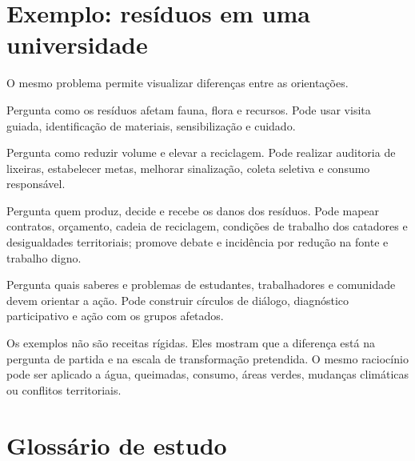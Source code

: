 \documentclass[12pt,a4paper]{article}
\begin{document}
\section{Exemplo: resíduos em uma universidade}

O mesmo problema permite visualizar diferenças entre as orientações.

\begin{description}[style=nextline,leftmargin=3.5cm,font=\normalfont\bfseries]
\item[Conservacionista] Pergunta como os resíduos afetam fauna, flora e recursos. Pode usar visita guiada, identificação de materiais, sensibilização e cuidado.
\item[Pragmática] Pergunta como reduzir volume e elevar a reciclagem. Pode realizar auditoria de lixeiras, estabelecer metas, melhorar sinalização, coleta seletiva e consumo responsável.
\item[Crítica] Pergunta quem produz, decide e recebe os danos dos resíduos. Pode mapear contratos, orçamento, cadeia de reciclagem, condições de trabalho dos catadores e desigualdades territoriais; promove debate e incidência por redução na fonte e trabalho digno.
\item[Popular] Pergunta quais saberes e problemas de estudantes, trabalhadores e comunidade devem orientar a ação. Pode construir círculos de diálogo, diagnóstico participativo e ação com os grupos afetados.
\end{description}

Os exemplos não são receitas rígidas. Eles mostram que a diferença está na pergunta de partida e na escala de transformação pretendida. O mesmo raciocínio pode ser aplicado a água, queimadas, consumo, áreas verdes, mudanças climáticas ou conflitos territoriais.

\section{Glossário de estudo}
\end{document}
